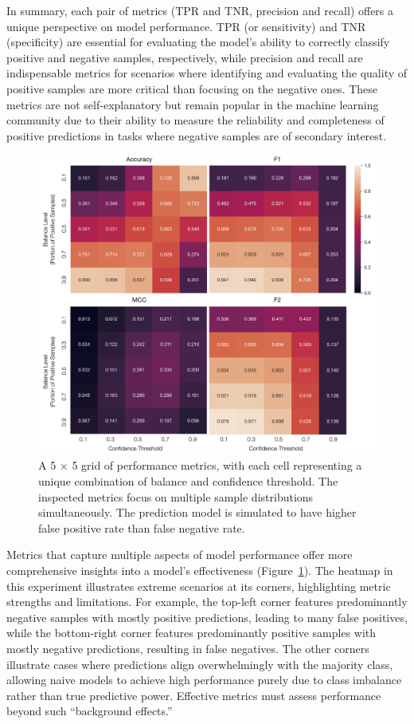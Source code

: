 In summary, each pair of metrics (TPR and TNR, precision and recall) offers a unique perspective on model performance. TPR (or sensitivity) and TNR (specificity) are essential for evaluating the model’s ability to correctly classify positive and negative samples, respectively, while precision and recall are indispensable metrics for scenarios where identifying and evaluating the quality of positive samples are more critical than focusing on the negative ones. These metrics are not self-explanatory but remain popular in the machine learning community due to their ability to measure the reliability and completeness of positive predictions in tasks where negative samples are of secondary interest.


\begin{figure}[H]
    \centering
    \includegraphics[width=.7\textwidth]{fig_11.jpg}
    \caption{A 5 × 5 grid of performance metrics, with each cell representing a unique combination of balance and confidence threshold. The inspected metrics focus on multiple sample distributions simultaneously. The prediction model is simulated to have higher false positive rate than false negative rate.}
    \label{fig:s5_2}
\end{figure}

Metrics that capture multiple aspects of model performance offer more comprehensive insights into a model’s effectiveness (Figure~\ref{fig:s5_2}). The heatmap in this experiment illustrates extreme scenarios at its corners, highlighting metric strengths and limitations. For example, the top-left corner features predominantly negative samples with mostly positive predictions, leading to many false positives, while the bottom-right corner features predominantly positive samples with mostly negative predictions, resulting in false negatives. The other corners illustrate cases where predictions align overwhelmingly with the majority class, allowing naive models to achieve high performance purely due to class imbalance rather than true predictive power. Effective metrics must assess performance beyond such “background effects.”

